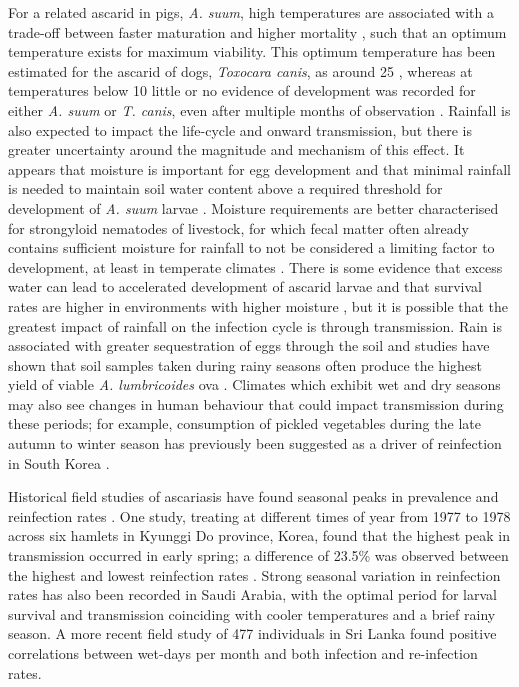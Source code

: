 For a related ascarid in pigs, \textit{A. suum}, high temperatures are associated with a trade-off between faster maturation and higher mortality \cite{Arene}, such that an optimum temperature exists for maximum viability. This optimum temperature has been estimated for the ascarid of dogs, \textit{Toxocara canis}, as around 25 \cite{Azam}, whereas at temperatures below 10 little or no evidence of development was recorded for either \textit{A. suum} or \textit{T. canis}, even after multiple months of observation \cite{Kim,Azam}. Rainfall is also expected to impact the life-cycle and onward transmission, but there is greater uncertainty around the magnitude and mechanism of this effect. It appears that moisture is important for egg development \cite{Caldwell1928} and that minimal rainfall is needed to maintain soil water content above a required threshold for development of \textit{A. suum} larvae \cite{Nilson}. Moisture requirements are better characterised for strongyloid nematodes of livestock, for which fecal matter often already contains sufficient moisture for rainfall to not be considered a limiting factor to development, at least in temperate climates \cite{OConnor2007,OConnor2008}. There is some evidence that excess water can lead to accelerated development of ascarid larvae \cite{Nilson} and that survival rates are higher in environments with higher moisture \cite{Roepstorff}, but it is possible that the greatest impact of rainfall on the infection cycle is through transmission. Rain is associated with greater sequestration of eggs through the soil and studies have shown that soil samples taken during rainy seasons often produce the highest yield of viable \textit{A. lumbricoides} ova \cite{Gelpi}. Climates which exhibit wet and dry seasons may also see changes in human behaviour that could impact transmission during these periods; for example, consumption of pickled vegetables during the late autumn to winter season has previously been suggested as a driver of reinfection in South Korea \cite{Seo}.

Historical field studies of ascariasis have found seasonal peaks in prevalence \cite{Pan, Gungoren} and reinfection rates \cite{Seo}. One study, treating at different times of year from 1977 to 1978 across six hamlets in Kyunggi Do province, Korea, found that the highest peak in transmission occurred in early spring; a difference of 23.5\% was observed between the highest and lowest reinfection rates \cite{Seo}. Strong seasonal variation in reinfection rates has also been recorded in Saudi Arabia\cite{Gelpi}, with the optimal period for larval survival and transmission coinciding with cooler temperatures and a brief rainy season. A more recent field study of 477 individuals in Sri Lanka \cite{Gunawardena} found positive correlations between wet-days per month and both infection and re-infection rates.


